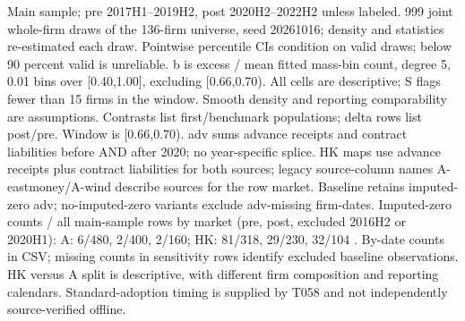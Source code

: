 \begin{threeparttable}
\begin{tablenotes}[flushleft]
\item[] Main sample; pre 2017H1--2019H2, post 2020H2--2022H2 unless labeled. 999 joint whole-firm draws of the 136-firm universe, seed 20261016; density and statistics re-estimated each draw. Pointwise percentile CIs condition on valid draws; below 90 percent valid is unreliable. b is excess / mean fitted mass-bin count, degree 5, 0.01 bins over [0.40,1.00], excluding [0.66,0.70). All cells are descriptive; S flags fewer than 15 firms in the window. Smooth density and reporting comparability are assumptions. Contrasts list first/benchmark populations; delta rows list post/pre. Window is [0.66,0.70). adv sums advance receipts and contract liabilities before AND after 2020; no year-specific splice. HK maps use advance receipts plus contract liabilities for both sources; legacy source-column names A-eastmoney/A-wind describe sources for the row market. Baseline retains imputed-zero adv; no-imputed-zero variants exclude adv-missing firm-dates. Imputed-zero counts / all main-sample rows by market (pre, post, excluded 2016H2 or 2020H1): A: 6/480, 2/400, 2/160; HK: 81/318, 29/230, 32/104 . By-date counts in CSV; missing counts in sensitivity rows identify excluded baseline observations. HK versus A split is descriptive, with different firm composition and reporting calendars. Standard-adoption timing is supplied by T058 and not independently source-verified offline.
\end{tablenotes}
\end{threeparttable}
\endgroup
\par\medskip
\begingroup\scriptsize\setlength{\tabcolsep}{3pt}
